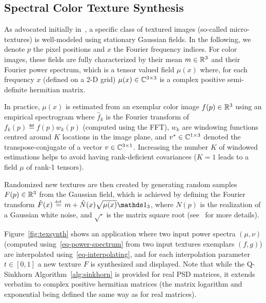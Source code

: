 

\subsection{Spectral Color Texture Synthesis}

As advocated initially in~\cite{galerne2011random}, a specific class of textured images (so-called micro-textures) is well-modeled using stationary Gaussian fields. In the following, we denote $p$ the pixel positions and $x$ the Fourier frequency indices. For color images, these fields are fully characterized by their mean $m \in \mathbb{R}^3$ and their Fourier power spectrum, which is a tensor valued field $\mu(x)$ where, for each frequency $x$ (defined on a 2-D grid) $\mu(x) \in \mathbb{C}^{3 \times 3}$ is a complex positive semi-definite hermitian matrix. 


In practice, $\mu(x)$ is estimated from an exemplar color image $f(p) \in \mathbb{R}^3$ using an empirical spectrogram 
where $\hat f_k$ is the Fourier transform of $f_k(p) \eqdef f(p) w_k(p)$ (computed using the FFT), $w_k$ are windowing functions centred around $K$ locations in the image plane, and $v^* \in \mathbb{C}^{1 \times 3}$ denoted the transpose-conjugate of a vector $v \in \mathbb{C}^{3 \times 1}$. 
%
Increasing the number $K$ of windowed estimations helps to avoid having rank-deficient covariances ($K=1$ leads to a field $\mu$ of rank-1 tensors).

Randomized new textures are then created by generating random samples $F(p) \in \mathbb{R}^3$ from the Gaussian field, which is achieved by defining the Fourier transform $\hat F(x) \eqdef m + \hat N(x) \sqrt{\mu(x)} \ones_3$, where $N(p)$ is the realization of a Gaussian white noise, and $\sqrt{\cdot}$ is the matrix square root (see~\cite{galerne2011random} for more details).

Figure~\ref{fig:texsynth} shows an application where two input power spectra $(\mu,\nu)$ (computed using~\eqref{eq-power-spectrum} from two input textures exemplars $(f,g)$)  are interpolated using~\eqref{eq-interpolating}, and for each interpolation parameter $t \in [0,1]$ a new texture $F$ is synthesized and displayed.
%
Note that while the Q-Sinkhorn Algorithm~\ref{alg:sinkhorn} is provided for real PSD matrices, it extends verbatim to complex positive hermitian matrices (the matrix logarithm and exponential being defined the same way as for real matrices).


